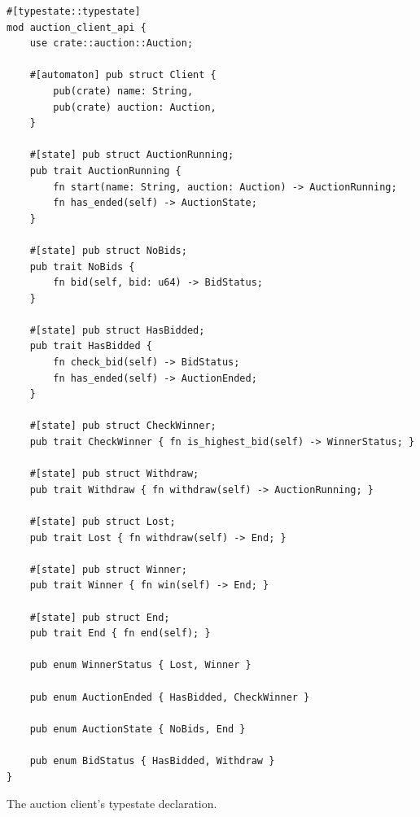 \begin{listing}
    \begin{verbatim}
#[typestate::typestate]
mod auction_client_api {
    use crate::auction::Auction;

    #[automaton] pub struct Client {
        pub(crate) name: String,
        pub(crate) auction: Auction,
    }

    #[state] pub struct AuctionRunning;
    pub trait AuctionRunning {
        fn start(name: String, auction: Auction) -> AuctionRunning;
        fn has_ended(self) -> AuctionState;
    }

    #[state] pub struct NoBids;
    pub trait NoBids {
        fn bid(self, bid: u64) -> BidStatus;
    }

    #[state] pub struct HasBidded;
    pub trait HasBidded {
        fn check_bid(self) -> BidStatus;
        fn has_ended(self) -> AuctionEnded;
    }

    #[state] pub struct CheckWinner;
    pub trait CheckWinner { fn is_highest_bid(self) -> WinnerStatus; }

    #[state] pub struct Withdraw;
    pub trait Withdraw { fn withdraw(self) -> AuctionRunning; }

    #[state] pub struct Lost;
    pub trait Lost { fn withdraw(self) -> End; }

    #[state] pub struct Winner;
    pub trait Winner { fn win(self) -> End; }

    #[state] pub struct End;
    pub trait End { fn end(self); }

    pub enum WinnerStatus { Lost, Winner }

    pub enum AuctionEnded { HasBidded, CheckWinner }

    pub enum AuctionState { NoBids, End }

    pub enum BidStatus { HasBidded, Withdraw }
}
    \end{verbatim}
    \caption{The auction client's typestate declaration.}
    \label{lst:typestate-auction-client}
\end{listing}